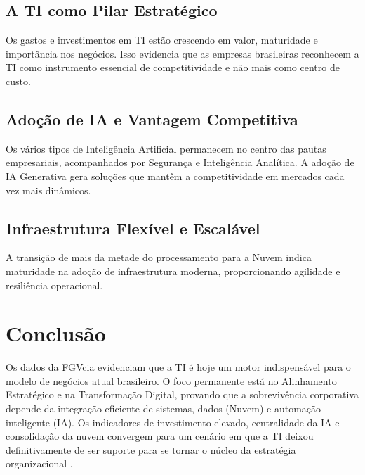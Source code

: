 \documentclass[12pt,a4paper,oneside]{article}
\begin{document}
\subsection{A TI como Pilar Estratégico}

Os gastos e investimentos em TI estão crescendo em valor, maturidade e importância nos negócios. Isso evidencia que as empresas brasileiras reconhecem a TI como instrumento essencial de competitividade e não mais como centro de custo.

\subsection{Adoção de IA e Vantagem Competitiva}

Os vários tipos de Inteligência Artificial permanecem no centro das pautas empresariais, acompanhados por Segurança e Inteligência Analítica. A adoção de IA Generativa gera soluções que mantêm a competitividade em mercados cada vez mais dinâmicos.

\subsection{Infraestrutura Flexível e Escalável}

A transição de mais da metade do processamento para a Nuvem indica maturidade na adoção de infraestrutura moderna, proporcionando agilidade e resiliência operacional.

\section{Conclusão}

Os dados da FGVcia evidenciam que a TI é hoje um motor indispensável para o modelo de negócios atual brasileiro. O foco permanente está no Alinhamento Estratégico e na Transformação Digital, provando que a sobrevivência corporativa depende da integração eficiente de sistemas, dados (Nuvem) e automação inteligente (IA). Os indicadores de investimento elevado, centralidade da IA e consolidação da nuvem convergem para um cenário em que a TI deixou definitivamente de ser suporte para se tornar o núcleo da estratégia organizacional \cite{porter1989}.



\end{document}
